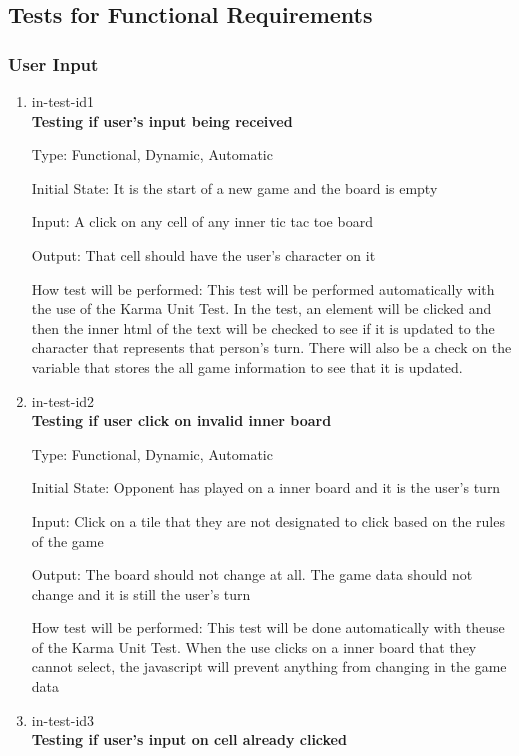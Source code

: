 \documentclass[12pt, titlepage]{article}
\begin{document}
\subsection{Tests for Functional Requirements}

\subsubsection{User Input}

\begin{enumerate}

\item{in-test-id1\\}
\textbf {Testing if user's input being received}

Type: Functional, Dynamic, Automatic
					
Initial State: It is the start of a new game and the board is empty
					
Input: A click on any cell of any inner tic tac toe board
					
Output: That cell should have the user's character on it
					
How test will be performed: This test will be performed automatically with the
use of the Karma Unit Test. In the test, an element will be clicked and then
the inner html of the text will be checked to see if it is updated to the
character that represents that person's turn. There will also be a check on
the variable that stores the all game information to see that it is updated.
					
\item{in-test-id2\\}
\textbf{Testing if user click on invalid inner board}

Type: Functional, Dynamic, Automatic
					
Initial State: Opponent has played on a inner board and it is the user's turn

Input: Click on a tile that they are not designated to click based on the
rules of the game
					
Output: The board should not change at all. The game data should not change
and it is still the user's turn
					
How test will be performed: This test will be done automatically with theuse
of the Karma Unit Test. When the use clicks on a inner board that they cannot
select, the javascript will prevent anything from changing in the game data

\item{in-test-id3\\}
\textbf{Testing if user's input on cell already clicked}


\end{enumerate}
\end{document}
